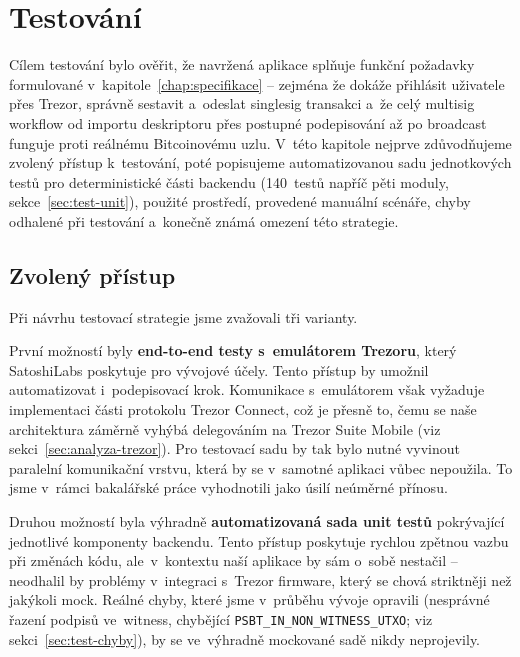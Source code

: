 
\chapter{Testování}
\label{chap:testovani}

Cílem testování bylo ověřit, že navržená aplikace splňuje funkční požadavky
formulované v~kapitole~\ref{chap:specifikace} -- zejména že dokáže přihlásit
uživatele přes Trezor, správně sestavit a~odeslat singlesig transakci a~že celý
multisig workflow od importu deskriptoru přes postupné podepisování až po
broadcast funguje proti reálnému Bitcoinovému uzlu. V~této kapitole nejprve
zdůvodňujeme zvolený přístup k~testování, poté popisujeme automatizovanou
sadu jednotkových testů pro deterministické části backendu (140~testů napříč
pěti moduly, sekce~\ref{sec:test-unit}), použité prostředí, provedené
manuální scénáře, chyby odhalené při testování a~konečně známá omezení
této strategie.

\section{Zvolený přístup}
\label{sec:test-pristup}

Při návrhu testovací strategie jsme zvažovali tři varianty.

První možností byly \textbf{end-to-end testy s~emulátorem Trezoru}, který
SatoshiLabs poskytuje pro vývojové účely. Tento přístup by umožnil
automatizovat i~podepisovací krok. Komunikace s~emulátorem však vyžaduje
implementaci části protokolu Trezor Connect, což je přesně to, čemu se
naše architektura záměrně vyhýbá delegováním na Trezor Suite Mobile (viz
sekci~\ref{sec:analyza-trezor}). Pro testovací sadu by tak bylo nutné
vyvinout paralelní komunikační vrstvu, která by se v~samotné aplikaci
vůbec nepoužila. To jsme v~rámci bakalářské práce vyhodnotili jako úsilí
neúměrné přínosu.

Druhou možností byla výhradně \textbf{automatizovaná sada unit testů}
pokrývající jednotlivé komponenty backendu. Tento přístup poskytuje
rychlou zpětnou vazbu při změnách kódu, ale~v~kontextu naší aplikace
by sám o~sobě nestačil -- neodhalil by problémy v~integraci s~Trezor
firmware, který se chová striktněji než jakýkoli mock. Reálné chyby,
které jsme v~průběhu vývoje opravili (nesprávné řazení podpisů
ve~witness, chybějící \texttt{PSBT\_IN\_NON\_WITNESS\_UTXO}; viz
sekci~\ref{sec:test-chyby}), by se ve~výhradně mockované sadě
nikdy neprojevily.

